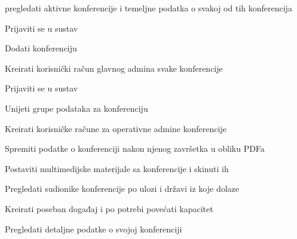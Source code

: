 			
			\begin{packed_enum}
				\item  {}
				
				\begin{packed_enum}
					
					\item pregledati aktivne konferencije i temeljne podatka o svakoj od tih konferencija
					
				\end{packed_enum}
			
				\item  {}
				
				\begin{packed_enum}
    
                        \item Prijaviti se u sustav					
					\item Dodati konferenciju
					\item Kreirati korisnički račun glavnog admina svake konferencije
					
				\end{packed_enum}
				
				\item  {}
				
				\begin{packed_enum}

                        \item Prijaviti se u sustav	
					\item Unijeti grupe podataka za konferenciju
					\item Kreirati korisničke račune za operativne admine konferencije
					\item Spremiti podatke o konferenciji nakon njenog završetka u obliku PDFa
					\item Postaviti multimedijske materijale sa konferencije i skinuti ih
					\item Pregledati sudionike konferencije po ulozi i državi iz koje dolaze
                        \item Kreirati poseban događaj i po potrebi povećati kapacitet
                        \item Pregledati detaljne podatke o svojoj konferenciji
					
				\end{packed_enum}
				
				\item  {}
				

\end{packed_enum}
